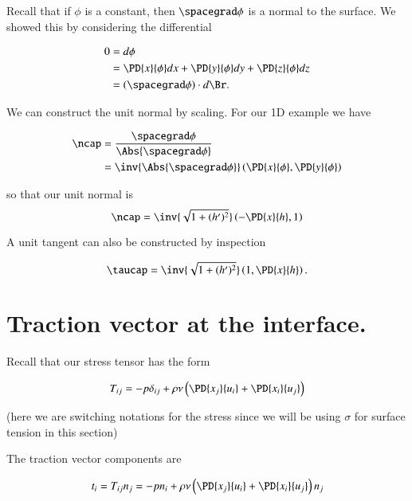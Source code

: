 Recall that if $\phi$ is a constant, then $\spacegrad \phi$ is a normal to the surface.  We showed this by considering the differential

\begin{align*}
0 
&= d\phi \\
&= 
\PD{x}{\phi} dx
+\PD{y}{\phi} dy
+\PD{z}{\phi} dz \\
&=
(\spacegrad \phi) \cdot d\Br.
\end{align*}

We can construct the unit normal by scaling.  For our 1D example we have

\begin{align*}
\ncap 
&= \frac{\spacegrad \phi}{\Abs{\spacegrad \phi}} \\
&= \inv{\Abs{\spacegrad \phi}} 
\left(
\PD{x}{\phi},
\PD{y}{\phi}
\right) 
\end{align*}

so that our unit normal is
\begin{equation}\label{eqn:continuumL14:50}
\ncap 
= \inv{ \sqrt{1 + (h')^2}}
\left( -\PD{x}{h}, 1 \right)
\end{equation}

A unit tangent can also be constructed by inspection

\begin{equation}\label{eqn:continuumL14:70}
\taucap 
= \inv{ \sqrt{1 + (h')^2}}
\left( 1, \PD{x}{h} \right).
\end{equation}

\section{Traction vector at the interface.}

Recall that our stress tensor has the form

\begin{equation}\label{eqn:continuumL14:90}
T_{ij} = 
- p \delta_{ij} + \rho \nu \left( 
\PD{x_j}{u_i}
+\PD{x_i}{u_j}
\right)
\end{equation}

(here we are switching notations for the stress since we will be using $\sigma$ for surface tension in this section)

The traction vector components are

\begin{equation}\label{eqn:continuumL14:110}
t_i = T_{ij} n_j =
- p n_i + \rho \nu \left( 
\PD{x_j}{u_i}
+\PD{x_i}{u_j}
\right) n_j
\end{equation}

